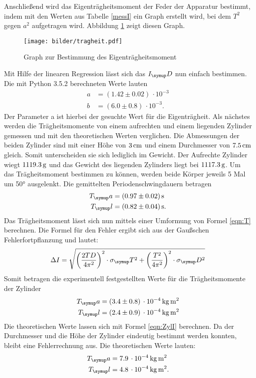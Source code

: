 Anschließend wird das Eigenträgheitsmoment der Feder der Apparatur bestimmt,
indem mit den Werten aus Tabelle \ref{messI} ein Graph erstellt wird, bei dem
$T^2$ gegen $a^2$ aufgetragen wird. Abbildung \ref{fig:trag} zeigt diesen Graph.
\begin{figure}[H]
  \centering
  \texttt{[image: bilder/tragheit.pdf]}
  \caption{Graph zur Bestimmung des Eigenträgheitsmoment}
  \label{fig:trag}
\end{figure}
Mit Hilfe der linearen Regression lässt sich das $I_\su{D}$ nun einfach bestimmen.
Die mit Python 3.5.2 berechneten Werte lauten
\begin{align*}
  a &= (1.42 \pm 0.02)\,\cdot10^{-3} \\
  b &= (6.0 \pm 0.8)\,\cdot10^{-3}.
\end{align*}
Der Parameter a ist hierbei der gesuchte Wert für die Eigenträgheit.
Als nächstes werden die Trägheitsmomente von einem aufrechten und einem liegenden
Zylinder gemessen und mit den theoretischen Werten verglichen. Die Abmessungen
der beiden Zylinder sind mit einer Höhe von $3\,\si{\centi\meter}$ und einem Durchmesser von $7.5\,\si{\centi\meter}$
gleich. Somit unterscheiden sie sich lediglich im Gewicht. Der Aufrechte Zylinder
wiegt $1119.3\,\si{\gram}$ und das Gewicht des liegenden Zylinders liegt bei $1117.3\,\si{\gram}$.
Um das Trägheitsmoment bestimmen zu können, werden beide Körper jeweils 5 Mal um
50° ausgelenkt. Die gemittelten Periodenschwingdauern betragen
\begin{align*}
  T_\su{a} &= (0.97 \pm 0.02)\sek \\
  T_\su{l} &= (0.82 \pm 0.04)\sek.
\end{align*}
Das Trägheitsmoment lässt sich nun mittels einer Umformung von Formel \eqref{eqn:T}
berechnen. Die Formel für den Fehler ergibt sich aus der Gaußschen Fehlerfortpflanzung
und lautet:
\begin{equation*}
  \Delta I = \sqrt{\biggl(\frac{2TD}{4\pi^2}\biggr)^2\cdot\sigma_\su{T}^2 +
  \biggl(\frac{T^2}{4\pi^2}\biggr)^2\cdot\sigma_\su{D}^2}
\end{equation*}
Somit betragen die experimentell festgestellten Werte für die Trägheitsmomente
der Zylinder
\begin{align*}
  T_\su{a} &= (3.4 \pm 0.8)\,\cdot10^{-4}\,\si{\kilo\gram\square\meter} \\
  T_\su{l} &= (2.4 \pm 0.9)\,\cdot10^{-4}\,\si{\kilo\gram\square\meter}
\end{align*}
Die theoretischen Werte lassen sich mit Formel \eqref{eqn:ZylI} berechnen.
Da der Durchmesser und die Höhe der Zylinder eindeutig bestimmt werden konnten,
bleibt eine Fehlerrechnung aus.
Die theoretischen Werte lauten:
\begin{align}
  T_\su{a} &= 7.9\,\cdot10^{-4}\,\si{\kilo\gram\square\meter} \\
  T_\su{l} &= 4.8\,\cdot10^{-4}\,\si{\kilo\gram\square\meter}.
\end{align}
